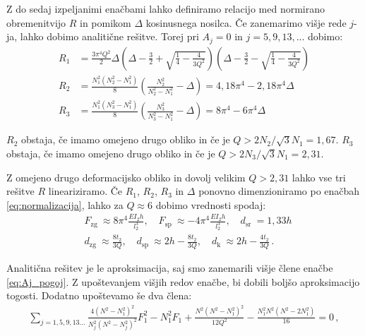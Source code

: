         Z do sedaj izpeljanimi enačbami lahko definiramo relacijo med normirano obremenitvijo  $R$ in pomikom $\Delta$ kosinusnega nosilca. Če zanemarimo višje rede $j$-ja, lahko dobimo analitične rešitve. Torej pri $A_j=0$ in $j=5, 9, 13, ...$ dobimo:
        \begin{align}
        R_1&=\frac{3 \pi^4 Q^2}{2} \Delta\left(\Delta-\frac{3}{2}+\sqrt{\frac{1}{4}-\frac{4}{3 Q^2}}\right)\left(\Delta-\frac{3}{2}-\sqrt{\frac{1}{4}-\frac{4}{3 Q^2}}\right) \\
        R_2&=\frac{N_1^2\left(N_2^2-N_1^2\right)}{8}\left(\frac{N_2^2}{N_2^2-N_1^2}-\Delta\right)=4,18 \pi^4-2,18 \pi^4 \Delta \\
        R_3&=\frac{N_1^2\left(N_3^2-N_1^2\right)}{8}\left(\frac{N_3^2}{N_3^2-N_1^2}-\Delta\right)=8 \pi^4-6 \pi^4 \Delta
        \end{align}
        
        $R_2$ obstaja, če imamo omejeno drugo obliko in če je $Q > 2 N_2/\sqrt{3}N_1=1,67$. $R_3$ obstaja, če imamo omejeno drugo obliko in če je $Q > 2 N_3/\sqrt{3}N_1=2,31$. 
        
        Z omejeno drugo deformacijsko obliko in dovolj velikim $Q > 2,31$ lahko vse tri rešitve $R$ lineariziramo. Če $R_1$,  $R_2$, $R_3$ in $\Delta$ ponovno dimenzioniramo po enačbah \eqref{eq:normalizacija}, lahko za $Q \approx 6$ dobimo vrednosti spodaj:
        \begin{equation}
            \begin{aligned}
            &F_{\text {zg }} \approx 8 \pi^4 \frac{E I_2 h}{l_2^3}, \quad F_{\text {sp }} \approx -4 \pi^4 \frac{E I_2 h}{l_2^3}, \quad d_{\text {sr }}=1,33 h \\
            &d_{\text {zg }} \approx \frac{8 t_2}{3 Q}, \quad d_{\text {sp }} \approx 2 h-\frac{8 t_2}{3 Q}, \quad d_{\text {k }} \approx 2 h-\frac{4 t_2}{3 Q} \,.
            \end{aligned}
        \end{equation}
        
        \newpage
        Analitična rešitev je le aproksimacija, saj smo zanemarili višje člene enačbe \eqref{eq:Aj_pogoj}. Z upoštevanjem višjih redov enačbe, bi dobili boljšo aproksimacijo togosti. Dodatno upoštevamo še dva člena:
        \begin{align}
            \sum_{j=1,5,9,13 \ldots} \frac{4\left(N^2-N_1^2\right)^2}{N_j^2\left(N^2-N_j^2\right)^2} F_1^2
            -N_1^2 F_1 + \frac{N^2\left(N^2-N_1^2\right)^2}{12 Q^2}-\frac{N_1^2 N^2\left(N^2-2 N_1^2\right)}{16}=0 \,,
        \end{align}
        
